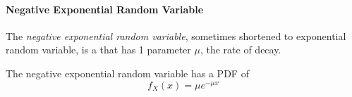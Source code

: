 \paragraph{Negative Exponential Random Variable}\label{par:Negative_Exponential_Random_Variable}
\begin{definition}\label{def:Negative_Exponential_Random_Variable}
  The \emph{negative exponential random variable}, sometimes shortened to exponential random variable, is a  that has 1 parameter $\mu$, the rate of decay.

  The negative exponential random variable has a PDF of
  \begin{equation}\label{eq:Negative_Exponential_Random_Variable-PDF}
    f_{X}(x) = \mu e^{-\mu x}
  \end{equation}
\end{definition}
